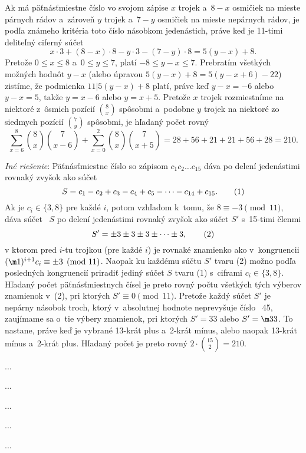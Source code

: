 {%
Ak má päťnásťmiestne číslo vo svojom zápise
$x$ trojek a~$8-x$ osmičiek na mieste párnych rádov a~zároveň
$y$ trojek a~$7-y$ osmičiek na mieste nepárnych rádov, je podľa
známeho kritéria toto číslo násobkom jedenástich, práve keď
je 11-timi deliteľný ciferný súčet
$$
x\cdot3+(8-x)\cdot8-y\cdot3-(7-y)\cdot8=5(y-x)+8.
$$
Pretože $0\le x\le8$ a~$0\le y\le7$, platí $-8\le y-x\le7$.
Prebratím  všetkých možných hodnôt $y-x$ (alebo úpravou
$5(y-x)+8=5(y-x+6)-22$) zistíme, že podmienka $11 | 5(y-x)+8$
platí, práve keď  $y-x=-6$ alebo $y-x=5$, takže $y=x-6$ alebo
$y=x+5$.  Pretože $x$ trojek rozmiestníme
na niektoré z~ôsmich pozícií
$\binom8x$ spôsobmi a~podobne $y$ trojek na niektoré zo siedmych pozícií
$\binom7y$ spôsobmi, je hľadaný počet rovný
$$
\sum_{x=6}^8\binom8x\binom7{x-6} +
\sum_{x=0}^2\binom8x\binom7{x+5}=
28+56+21+21+56+28=210.
$$

\medskip
{\it Iné riešenie\/}: Päťnásťmiestne číslo so zápisom $c_1c_2\dots c_{15}$
dáva po delení jedenástimi rovnaký zvyšok ako súčet
$$
S=c_1-c_2+c_3-c_4+c_5-\dots-c_{14}+c_{15}.
\tag 1
$$
Ak je $c_i\in\{3,8\}$ pre každé $i$, potom vzhľadom k~tomu,
že $8\equiv-3\pmod {11}$, dáva súčet~ $S$ po delení jedenástimi
rovnaký zvyšok ako súčet $S'$ s~15-timi členmi
$$
S'=\pm3\pm3\pm3\pm\dots\pm3,
\tag 2
$$
v ktorom pred $i$-tu trojkou (pre každé $i$) je rovnaké
znamienko ako v~kongruencii $(\m1)^{i+1}c_i\equiv\pm3\pmod{11}$.
Naopak ku každému súčtu $S'$ tvaru (2) možno podľa posledných
kongruencií priradiť jediný súčet $S$ tvaru (1) s~ciframi
$c_i\in\{3,8\}$. Hľadaný počet päťnásťmiestnych čísel je preto
rovný počtu všetkých tých výberov znamienok v~(2), pri ktorých
$S'\equiv0\pmod{11}$. Pretože každý súčet $S'$ je nepárny
násobok troch, ktorý v~absolutnej hodnote neprevyšuje číslo~ 45,
zaujímame sa o~tie výbery znamienok, pri ktorých $S'=33$ alebo $S'=\m33$. To
nastane, práve keď je vybrané 13-krát plus a~2-krát
mínus, alebo naopak 13-krát mínus a~2-krát plus. Hľadaný počet je preto
rovný $2\cdot\binom{15}{2}=210$.
}

{%
...}

{%
...}

{%
...}

{%
...}

{%
...}

